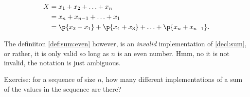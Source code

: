 \begin{align}
X&=x_1+x_2+\ldots+x_n\\
&=x_n+x_{n-1}+\ldots+x_1\\
&=\p{x_2+x_1}+\p{x_4+x_3}+\ldots+\p{x_n+x_{n-1}}\label{def:sum:even}.
\end{align}

The definiiton \ref{def:sum:even} however, is an \emph{invalid} implementation
of \ref{decl:sum}, or rather, it is only valid so long as $n$ is an even
number. Hmm, no it is not invalid, the notation is just ambiguous.


Exercise: for a sequence of size $n$, how many different implementations of a
sum of the values in the sequence are there?
